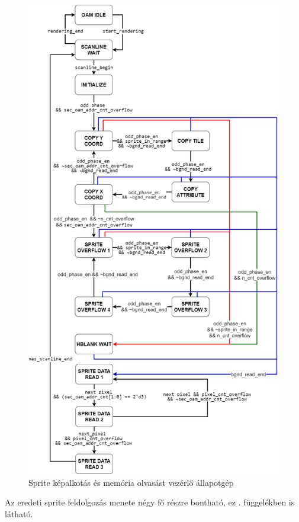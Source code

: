 	\begin{figure}[H]
	\centering
	\includegraphics[width=125mm, keepaspectratio]{figures/sprite-rendering-FSM-v3}
	\caption{Sprite képalkotás és memória olvasást vezérlő állapotgép} 
	\label{fig:sprite-rendering-FSM}
	\end{figure} 

	 Az eredeti sprite feldolgozás menete négy fő részre bontható, ez . függelékben is látható. 	
	
